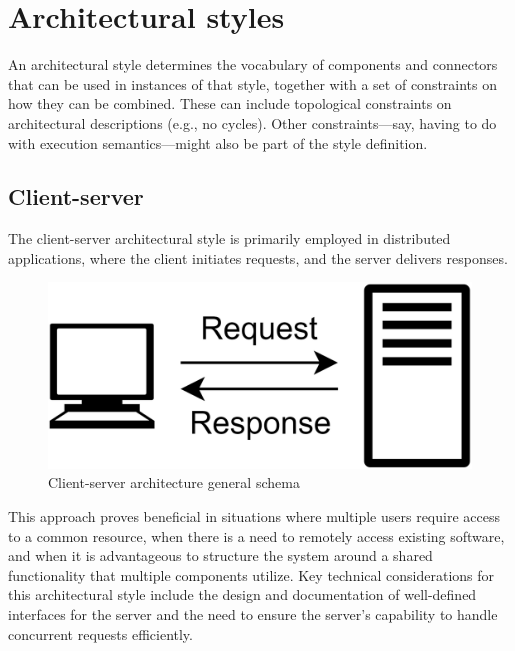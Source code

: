 \section{Architectural styles}  

\begin{definition}
    An architectural style determines the vocabulary of components and connectors that can be used in instances of that style, together with a set of constraints on how they can be combined.
    These can include topological constraints on architectural descriptions (e.g., no cycles). 
    Other constraints—say, having to do with execution semantics—might also be part of the style definition.
\end{definition}

\subsection{Client-server}
The client-server architectural style is primarily employed in distributed applications, where the client initiates requests, and the server delivers responses.
\begin{figure}[H]
    \centering
    \includegraphics[width=0.35\linewidth]{images/clientserver.png}
    \caption{Client-server architecture general schema}
\end{figure}
This approach proves beneficial in situations where multiple users require access to a common resource, when there is a need to remotely access existing software, and when it is advantageous to structure the system around a shared functionality that multiple components utilize.
Key technical considerations for this architectural style include the design and documentation of well-defined interfaces for the server and the need to ensure the server's capability to handle concurrent requests efficiently.

